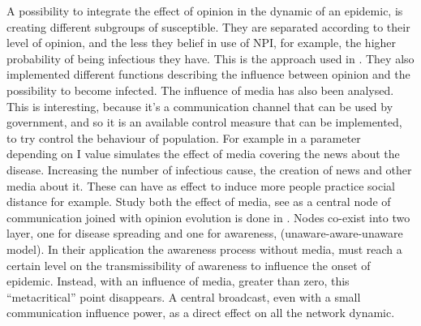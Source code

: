 A possibility to integrate the effect of opinion in the dynamic of an epidemic, is creating different subgroups of susceptible. They are separated according to their level of opinion, and the less they belief in use of NPI, for example, the higher probability of being infectious they have. This is the approach used in \cite{Tyson_2020}. They also implemented different functions describing the influence between opinion and the possibility to become infected. 
The influence of media has also been analysed. This is interesting, because it’s a communication channel that can be used by government, and so it is an available control measure that can be implemented, to try control the behaviour of population.  For example in \cite{Collinson2014} a parameter depending on I value simulates the effect of media covering the news about the disease. Increasing the number of infectious cause, the creation of news and other media about it. These can have as effect to induce more people practice social distance for example. Study both the effect of media, see as a central node of communication joined with opinion evolution is done in \cite{Granell_2014}. Nodes co-exist into two layer, one for disease spreading and one for awareness, (unaware-aware-unaware model). In their application the awareness process without media, must reach a certain level on the transmissibility of awareness to influence the onset of epidemic. Instead, with an influence of media, greater than zero, this “metacritical” point disappears. A central broadcast, even with a small communication influence power, as a direct effect on all the network dynamic. 